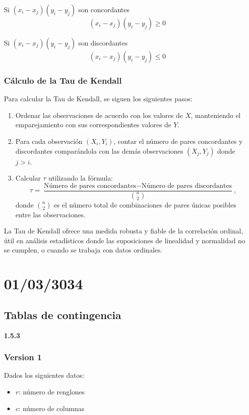 \documentclass{article}
\begin{document}
Si $(x_i - x_j)(y_i - y_j)$ son concordantes
\[(x_i - x_j)(y_i - y_j) \geq 0\]

Si $(x_i - x_j)(y_i - y_j)$ son discordantes
\[(x_i - x_j)(y_i - y_j) \leq 0\]

\subsubsection*{Cálculo de la Tau de Kendall}

Para calcular la Tau de Kendall, se siguen los siguientes pasos:

\begin{enumerate}
    \item Ordenar las observaciones de acuerdo con los valores de \(X\), manteniendo el emparejamiento con sus correspondientes valores de \(Y\).
    \item Para cada observación \((X_i, Y_i)\), contar el número de pares concordantes y discordantes comparándola con las demás observaciones \((X_j, Y_j)\) donde \(j > i\).
    \item Calcular \(\tau\) utilizando la fórmula:
          \[
              \tau = \frac{\text{Número de pares concordantes} - \text{Número de pares discordantes}}{\binom{n}{2}},
          \]
          donde \(\binom{n}{2}\) es el número total de combinaciones de pares únicas posibles entre las observaciones.
\end{enumerate}

La Tau de Kendall ofrece una medida robusta y fiable de la correlación ordinal, útil en análisis estadísticos donde las suposiciones de linealidad y normalidad no se cumplen, o cuando se trabaja con datos ordinales.
\newpage
\section{01/03/3034}

\subsection{Tablas de contingencia}

\textbf{1.5.3}

\subsubsection*{Version 1}
Dados los siguientes datos:

\begin{itemize}
    \item $r$: número de renglones
    \item $c$: número de columnas
\end{itemize}
\end{document}
